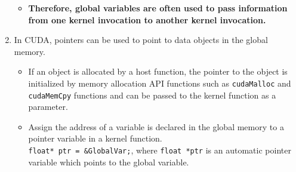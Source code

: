 \begin{enumerate}
\begin{itemize}
                  \item \textbf{Therefore, global variables are often used to pass information from one kernel invocation to another kernel invocation.}
            \end{itemize}
      \item In CUDA, pointers can be used to point to data objects in the global memory.
            \begin{itemize}
                  \item If an object is allocated by a host function, the pointer to the object is initialized by memory allocation API functions such as \texttt{cudaMalloc} and \texttt{cudaMemCpy} functions and can be passed to the kernel function as a parameter.
                  \item Assign the address of a  variable is declared in the global memory to a pointer variable in a kernel function.\\
                        \texttt{float* ptr = \&GlobalVar;}, where \texttt{float *ptr} is an automatic pointer variable which points to the global variable.
            \end{itemize}
\end{enumerate}

\pagebreak
